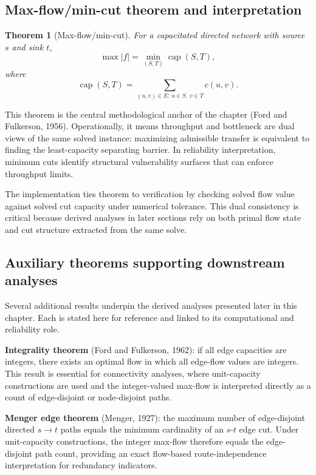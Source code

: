 \documentclass[12pt]{report}
\newtheorem{theorem}{Theorem}[chapter]
\begin{document}
\subsection{Max-flow/min-cut theorem and interpretation}

\begin{theorem}[Max-flow/min-cut]
For a capacitated directed network with source $s$ and sink $t$,
\[
\max |f| = \min_{(S,T)} \operatorname{cap}(S,T),
\]
where
\[
\operatorname{cap}(S,T)=\sum_{(u,v)\in E:\,u\in S,\,v\in T} c(u,v).
\]
\end{theorem}

This theorem is the central methodological anchor of the chapter (Ford and Fulkerson, 1956). Operationally, it means throughput and bottleneck are dual views of the same solved instance: maximizing admissible transfer is equivalent to finding the least-capacity separating barrier. In reliability interpretation, minimum cuts identify structural vulnerability surfaces that can enforce throughput limits.

The implementation ties theorem to verification by checking solved flow value against solved cut capacity under numerical tolerance. This dual consistency is critical because derived analyses in later sections rely on both primal flow state and cut structure extracted from the same solve.

\subsection{Auxiliary theorems supporting downstream analyses}

Several additional results underpin the derived analyses presented later in this chapter. Each is stated here for reference and linked to its computational and reliability role.

\textbf{Integrality theorem} (Ford and Fulkerson, 1962): if all edge capacities are integers, there exists an optimal flow in which all edge-flow values are integers. This result is essential for connectivity analyses, where unit-capacity constructions are used and the integer-valued max-flow is interpreted directly as a count of edge-disjoint or node-disjoint paths.

\textbf{Menger edge theorem} (Menger, 1927): the maximum number of edge-disjoint directed $s\to t$ paths equals the minimum cardinality of an $s$-$t$ edge cut. Under unit-capacity constructions, the integer max-flow therefore equals the edge-disjoint path count, providing an exact flow-based route-independence interpretation for redundancy indicators.
\end{document}
